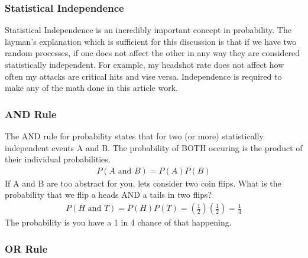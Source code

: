 \documentclass{article}
\begin{document}
\subsubsection{Statistical Independence}

Statistical Independence is an incredibly important concept in probability. The layman's explanation which is sufficient for this discussion is that if we have two random processes, if one does not affect the other in any way they are considered statistically independent. For example, my headshot rate does not affect how often my attacks are critical hits and vise versa. Independence is required to make any of the math done in this article work.

\subsubsection{AND Rule}

The AND rule for probability states that for two (or more) statistically independent events A and B. The probability of BOTH occuring is the product of their individual probabilities.
\begin{align*}
P(A \text{ and } B) = P(A)P(B)
\end{align*}
If A and B are too abstract for you, lets consider two coin flips. What is the probability that we flip a heads AND a tails in two flips?
\begin{align*}
P(H \text{ and } T) = P(H)P(T) = (\tfrac{1}{2})(\tfrac{1}{2}) = \frac{1}{4}
\end{align*}
The probability is you have a 1 in 4 chance of that happening.

\subsubsection{OR Rule}
\end{document}
